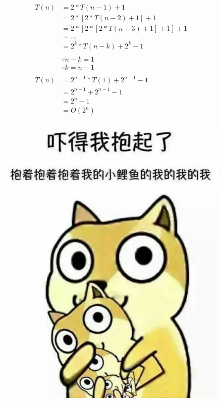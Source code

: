 \begin{align*}
	T(n) & = 2 * T(n - 1) + 1                     \\
	     & = 2 * [ 2 * T(n - 2) + 1] + 1          \\
	     & = 2 * [2 * [2 * T(n - 3) + 1] + 1] + 1 \\
	     & = \dots                                \\
	     & = 2^k * T(n - k) + 2^k - 1             \\
	\\
	     & \because n - k = 1                     \\
	     & \therefore k = n - 1                   \\
	\\
	T(n) & = 2^{n-1} * T(1) + 2^{n-1} - 1         \\
	     & = 2^{n-1} + 2^{n-1} - 1                \\
	     & = 2^n - 1                              \\
	     & = O(2^n)
\end{align*}

\begin{figure}[H]
	\centering
	\includegraphics[]{img/Chapter11/11-3/1.png}
\end{figure}

